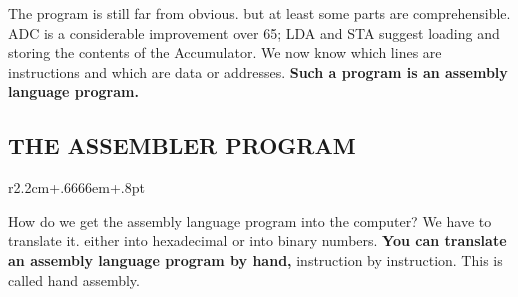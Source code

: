 \documentclass{book}
\begin{document}
The program is still far from obvious. but at least some parts are comprehensible. ADC is a considerable improvement over 65; LDA and STA suggest loading and storing the contents of the Accumulator. We now know which lines are instructions and which are data or addresses. \noindent \textbf{Such a program is an assembly language program.}

\subsection*{THE ASSEMBLER PROGRAM}

\begin{wrapfigure}{r}{2.2cm+.6666em+.8pt}
\end{wrapfigure}
How do we get the assembly language program into the computer? We have to translate it. either into hexadecimal or into binary numbers. \textbf{You can translate an assembly language program by hand,} instruction by instruction. This is called hand assembly.
\end{document}
